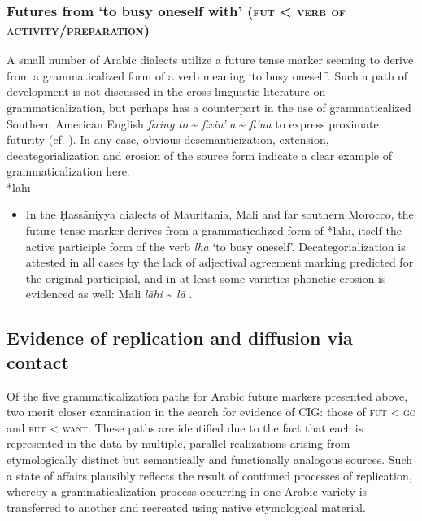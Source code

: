 \documentclass[output=paper]{langsci/langscibook}
\begin{document}
\subsubsection{ Futures from ‘to busy oneself with’ (\textsc{fut} < \textsc{verb} \textsc{of} \textsc{activity/preparation})}

A small number of Arabic dialects utilize a future tense marker seeming to derive from a grammaticalized form of a verb meaning ‘to busy oneself’. Such a path of development is not discussed in the cross-linguistic literature on grammaticalization, but perhaps has a counterpart in the use of grammaticalized Southern American English \textit{fixing} \textit{to} {\textasciitilde} \textit{fixin’} \textit{a} {\textasciitilde} \textit{fi’na} to express proximate futurity (cf. \citealt{Wolfram1998}). In any case, obvious desemanticization, extension, decategorialization and erosion of the source form indicate a clear example of grammaticalization here.\\
 
*lāhī

\begin{itemize}

  \item[]
In the Ḥassāniyya dialects of Mauritania, Mali and far southern Morocco, the future tense marker derives from a grammaticalized form of *lāhī, itself the active participle form of the verb \textit{lha} ‘to busy oneself’. Decategorialization is attested in all cases by the lack of adjectival agreement marking predicted for the original participial, and in at least some varieties phonetic erosion is evidenced as well: Mali \textit{lāhi} {\textasciitilde} \textit{lā} \citep{Heath2003}.
\end{itemize}

\subsection{ Evidence of replication and diffusion via contact}\label{sec:repl}


Of the five grammaticalization paths for Arabic future markers presented above, two merit closer examination in the search for evidence of CIG: those of \textsc{fut} < \textsc{go} and \textsc{fut} < \textsc{want}. These paths are identified due to the fact that each is represented in the data by multiple, parallel realizations arising from etymologically distinct but semantically and functionally analogous sources. Such a state of affairs plausibly reflects the result of continued processes of replication, whereby a grammaticalization process occurring in one Arabic variety is transferred to another and recreated using native etymological material.
\end{document}
